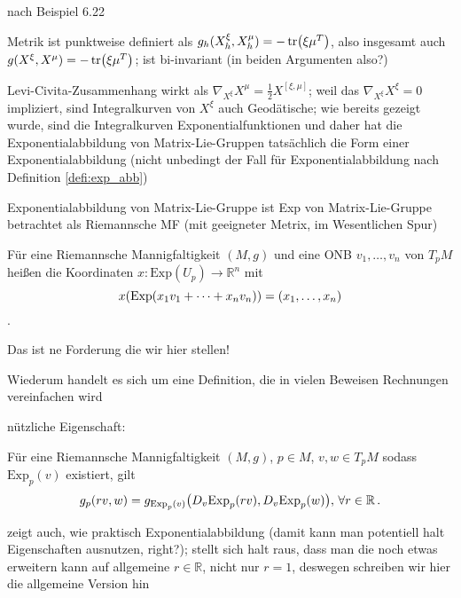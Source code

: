 \documentclass[../H_Analysis_main.tex]{subfiles}
\begin{document}
\begin{bsp}
nach Beispiel 6.22

Metrik ist punktweise definiert als $g_h(X^\xi_h, X^\mu_h) = - \tr(\xi \mu^T)$, also insgesamt auch $g(X^\xi, X^\mu) = - \tr(\xi \mu^T)$; ist bi-invariant (in beiden Argumenten also?)

Levi-Civita-Zusammenhang wirkt als $\nabla_{X^\xi} X^\mu = \frac{1}{2} X^{[\xi, \mu]}$; weil das $\nabla_{X^\xi} X^\xi = 0$ impliziert, sind Integralkurven von $X^\xi$ auch Geodätische; wie bereits gezeigt wurde, sind die Integralkurven Exponentialfunktionen und daher hat die Exponentialabbildung von Matrix-Lie-Gruppen tatsächlich die Form einer Exponentialabbildung (nicht unbedingt der Fall für Exponentialabbildung nach Definition \ref{defi:exp_abb})

Exponentialabbildung von Matrix-Lie-Gruppe ist Exp von Matrix-Lie-Gruppe betrachtet als Riemannsche MF (mit geeigneter Metrix, im Wesentlichen Spur)
\end{bsp}


\begin{defi}
Für eine Riemannsche Mannigfaltigkeit $(M, g)$ und eine ONB $v_1, \dots, v_n$ von $T_p M$ heißen die Koordinaten $x: \text{Exp}(U_p) \rightarrow \mathbb{R}^n$ mit
\begin{equation}
x(\text{Exp}(x_1 v_1 + \dots + x_n v_n)) = \qty(x_1, \dots, x_n)
\end{equation}
.
\end{defi}

Das ist ne Forderung die wir hier stellen!

Wiederum handelt es sich um eine Definition, die in vielen Beweisen Rechnungen vereinfachen wird


nützliche Eigenschaft:
\begin{lemma}
Für eine Riemannsche Mannigfaltigkeit $(M, g)$, $p \in M$, $v, w \in T_p M$ sodass $\text{Exp}_p (v)$ existiert, gilt
\begin{equation}
g_p(r v, w) = g_{\text{Exp}_p(v)} \qty(D_v \text{Exp}_p (r v), D_v \text{Exp}_p (w)), \, \forall r \in \mathbb{R} \, .
\end{equation}
\end{lemma}
zeigt auch, wie praktisch Exponentialabbildung (damit kann man potentiell halt Eigenschaften ausnutzen, right?); stellt sich halt raus, dass man die noch etwas erweitern kann auf allgemeine $r \in \mathbb{R}$, nicht nur $r = 1$, deswegen schreiben wir hier die allgemeine Version hin
\end{document}
